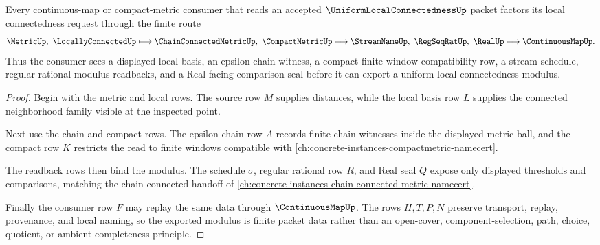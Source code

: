 \begin{theorem}
\label{thm:uniform-local-connectedness-chain-modulus-handoff}
Every continuous-map or compact-metric consumer that reads an accepted $\UniformLocalConnectednessUp$ packet factors its local connectedness request through the finite route
$$
\MetricUp,\ \LocallyConnectedUp
\longmapsto
\ChainConnectedMetricUp,\ \CompactMetricUp
\longmapsto
\StreamNameUp,\ \RegSeqRatUp,\ \RealUp
\longmapsto
\ContinuousMapUp .
$$
Thus the consumer sees a displayed local basis, an epsilon-chain witness, a compact finite-window compatibility row, a stream schedule, regular rational modulus readbacks, and a Real-facing comparison seal before it can export a uniform local-connectedness modulus.
\end{theorem}
\begin{proof}
Begin with the metric and local rows. The source row $M$ supplies distances, while the local basis row $L$ supplies the connected neighborhood family visible at the inspected point.

Next use the chain and compact rows. The epsilon-chain row $A$ records finite chain witnesses inside the displayed metric ball, and the compact row $K$ restricts the read to finite windows compatible with \autoref{ch:concrete-instances-compactmetric-namecert}.

The readback rows then bind the modulus. The schedule $\sigma$, regular rational row $R$, and Real seal $Q$ expose only displayed thresholds and comparisons, matching the chain-connected handoff of \autoref{ch:concrete-instances-chain-connected-metric-namecert}.

Finally the consumer row $F$ may replay the same data through $\ContinuousMapUp$. The rows $H,T,P,N$ preserve transport, replay, provenance, and local naming, so the exported modulus is finite packet data rather than an open-cover, component-selection, path, choice, quotient, or ambient-completeness principle.
\end{proof}


